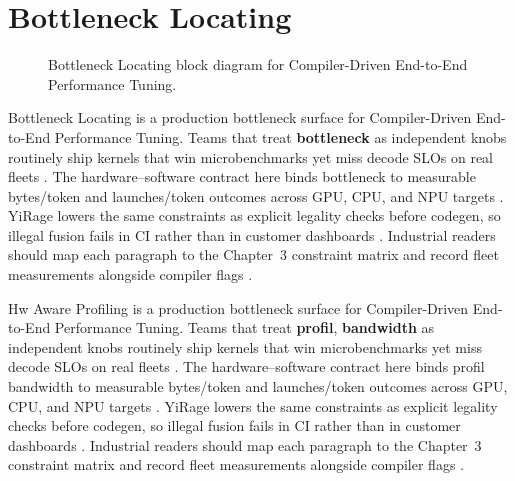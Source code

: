 \section{Bottleneck Locating}
\label{sec:bottleneck_locating}
\begin{figure}[t]
\centering
{}
\caption{Bottleneck Locating block diagram for Compiler-Driven End-to-End Performance Tuning.}
\label{fig:bottleneck_locating_architecture}
\end{figure}


Bottleneck Locating is a production bottleneck surface for Compiler-Driven End-to-End Performance Tuning. Teams that treat \textbf{bottleneck} as independent knobs routinely ship kernels that win microbenchmarks yet miss decode SLOs on real fleets \citep{taxbreak2026,semianalysis2024tma}. The hardware--software contract here binds bottleneck to measurable bytes/token and launches/token outcomes across GPU, CPU, and NPU targets \citep{memoryfloor2026,amd2024xdna}. YiRage lowers the same constraints as explicit legality checks before codegen, so illegal fusion fails in CI rather than in customer dashboards \citep{nvidia2022hopper,amd2024aie}. Industrial readers should map each paragraph to the Chapter~3 constraint matrix and record fleet measurements alongside compiler flags \citep{semianalysis2024tma,dlbook}.

Hw Aware Profiling is a production bottleneck surface for Compiler-Driven End-to-End Performance Tuning. Teams that treat \textbf{profil}, \textbf{bandwidth} as independent knobs routinely ship kernels that win microbenchmarks yet miss decode SLOs on real fleets \citep{liu2024deepseekv3,memoryfloor2026}. The hardware--software contract here binds profil bandwidth to measurable bytes/token and launches/token outcomes across GPU, CPU, and NPU targets \citep{patel2025llminference,nvidia2022hopper}. YiRage lowers the same constraints as explicit legality checks before codegen, so illegal fusion fails in CI rather than in customer dashboards \citep{taxbreak2026,semianalysis2024tma}. Industrial readers should map each paragraph to the Chapter~3 constraint matrix and record fleet measurements alongside compiler flags \citep{memoryfloor2026,amd2024xdna}.

